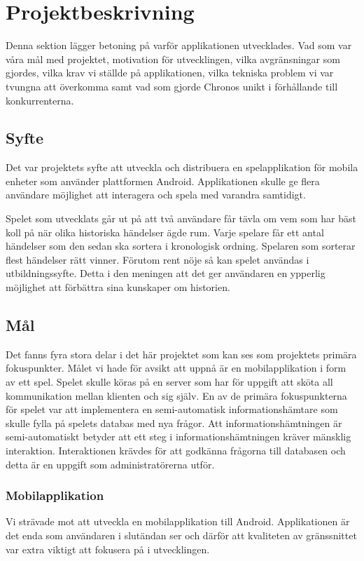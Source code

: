 \documentclass[a4paper, 11pt]{article}
\begin{document}
\section{Projektbeskrivning}
Denna sektion lägger betoning på varför applikationen utvecklades. Vad som var våra mål med projektet, motivation för utvecklingen, vilka avgränsningar som gjordes, vilka krav vi ställde på applikationen, vilka tekniska problem vi var tvungna att överkomma samt vad som gjorde Chronos unikt i förhållande till konkurrenterna.

\subsection{Syfte}
Det var projektets syfte att utveckla och distribuera en spelapplikation för mobila enheter som använder plattformen Android. Applikationen skulle ge flera användare möjlighet att interagera och spela med varandra samtidigt.

Spelet som utvecklats går ut på att två användare får tävla om vem som har bäst koll på när olika historiska händelser ägde rum. Varje spelare får ett antal händelser som den sedan ska sortera i kronologisk ordning. Spelaren som sorterar flest händelser rätt vinner. Förutom rent nöje så kan spelet användas i utbildningssyfte. Detta i den meningen att det ger användaren en ypperlig möjlighet att förbättra sina kunskaper om historien.

\subsection{Mål}
Det fanns fyra stora delar i det här projektet som kan ses som projektets primära fokuspunkter. Målet vi hade för avsikt att uppnå är en mobilapplikation i form av ett spel. Spelet skulle köras på en server som har för uppgift att sköta all kommunikation mellan klienten och sig själv. En av de primära fokuspunkterna för spelet var att implementera en semi-automatisk informationshämtare som skulle fylla på spelets databas med nya frågor. Att informationshämtningen är semi-automatiskt betyder att ett steg i informationshämtningen kräver mänsklig interaktion. Interaktionen krävdes för att godkänna frågorna till databasen och detta är en uppgift som administratörerna utför. 


\subsubsection{Mobilapplikation}
Vi strävade mot att utveckla en mobilapplikation till Android. Applikationen är det enda som användaren i slutändan ser och därför att kvaliteten av gränssnittet var extra viktigt att fokusera på i utvecklingen. 
\end{document}
